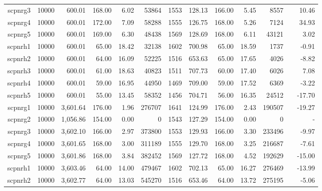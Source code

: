 \documentclass[11pt]{article}
\begin{document}
\begin{landscape}
\begin{table}[]
\begin{tabular}{rrr|rrr|rrrrr|rr}
            scpnrg3 & 10000 & 600.01      & 168.00  & 6.02  & 53864     & 1553 & 128.13         & 166.00  & 5.45  & 8557      &  & 10.46    \\
            scpnrg4 & 10000 & 600.01      & 172.00  & 7.09  & 58288     & 1555 & 126.75         & 168.00  & 5.26  & 7124      &  & 34.93    \\
            scpnrg5 & 10000 & 600.01      & 169.00  & 6.30  & 48438     & 1569 & 128.69         & 168.00  & 6.11  & 43121     &  & 3.02     \\
            scpnrh1 & 10000 & 600.01      & 65.00   & 18.42 & 32138     & 1602 & 700.98         & 65.00   & 18.59 & 1737      &  & -0.91    \\
            scpnrh2 & 10000 & 600.01      & 64.00   & 16.09 & 52225     & 1516 & 653.63         & 65.00   & 17.65 & 4026      &  & -8.82    \\
            scpnrh3 & 10000 & 600.01      & 61.00   & 18.63 & 40823     & 1511 & 707.73         & 60.00   & 17.40 & 6026      &  & 7.08     \\
            scpnrh4 & 10000 & 600.01      & 59.00   & 16.95 & 44950     & 1469 & 709.00         & 59.00   & 17.52 & 6369      &  & -3.22    \\
            scpnrh5 & 10000 & 600.01      & 55.00   & 13.45 & 58352     & 1456 & 704.71         & 56.00   & 16.35 & 24512     &  & -17.70   \\
            \hline
            scpnrg1 & 10000 & 3,601.64    & 176.00  & 1.96  & 276707    & 1641 & 124.99         & 176.00  & 2.43  & 190507    &  & -19.27   \\
            scpnrg2 & 10000 & 1,056.86    & 154.00  & 0.00  & 0         & 1543 & 127.29         & 154.00  & 0.00  & 0         &  & - \\
            scpnrg3 & 10000 & 3,602.10    & 166.00  & 2.97  & 373800    & 1553 & 129.93         & 166.00  & 3.30  & 233496    &  & -9.97    \\
            scpnrg4 & 10000 & 3,601.65    & 168.00  & 3.00  & 311189    & 1555 & 129.70         & 168.00  & 3.25  & 216687    &  & -7.61    \\
            scpnrg5 & 10000 & 3,601.86    & 168.00  & 3.84  & 382452    & 1569 & 127.72         & 168.00  & 4.52  & 192629    &  & -15.00   \\
            scpnrh1 & 10000 & 3,603.46    & 64.00   & 14.00 & 479467    & 1602 & 702.13         & 65.00   & 16.27 & 276469    &  & -13.99   \\
            scpnrh2 & 10000 & 3,602.77    & 64.00   & 13.03 & 545270    & 1516 & 653.46         & 64.00   & 13.72 & 275195    &  & -5.06    \\

\end{tabular}
\end{table}
\end{landscape}
\end{document}
